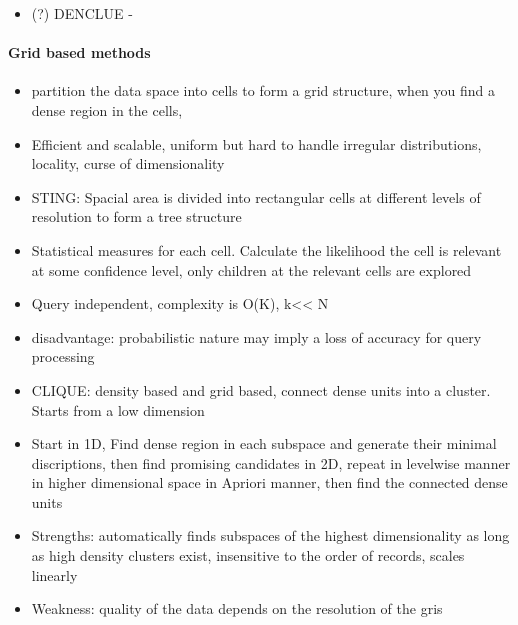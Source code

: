 \documentclass[11pt]{article}
\providecommand{\tightlist}{%
      \setlength{\itemsep}{0pt}\setlength{\parskip}{0pt}}
\begin{document}
    \begin{itemize}
\tightlist
\item
  (?) DENCLUE -
\end{itemize}

    \paragraph{Grid based methods}\label{grid-based-methods}

    \begin{itemize}
\tightlist
\item
  partition the data space into cells to form a grid structure, when you
  find a dense region in the cells,
\item
  Efficient and scalable, uniform but hard to handle irregular
  distributions, locality, curse of dimensionality
\end{itemize}

    \begin{itemize}
\tightlist
\item
  STING: Spacial area is divided into rectangular cells at different
  levels of resolution to form a tree structure
\item
  Statistical measures for each cell. Calculate the likelihood the cell
  is relevant at some confidence level, only children at the relevant
  cells are explored
\item
  Query independent, complexity is O(K), k\textless{}\textless{} N
\item
  disadvantage: probabilistic nature may imply a loss of accuracy for
  query processing
\end{itemize}

    \begin{itemize}
\tightlist
\item
  CLIQUE: density based and grid based, connect dense units into a
  cluster. Starts from a low dimension
\item
  Start in 1D, Find dense region in each subspace and generate their
  minimal discriptions, then find promising candidates in 2D, repeat in
  levelwise manner in higher dimensional space in Apriori manner, then
  find the connected dense units
\item
  Strengths: automatically finds subspaces of the highest dimensionality
  as long as high density clusters exist, insensitive to the order of
  records, scales linearly
\item
  Weakness: quality of the data depends on the resolution of the gris
\end{itemize}
\end{document}
